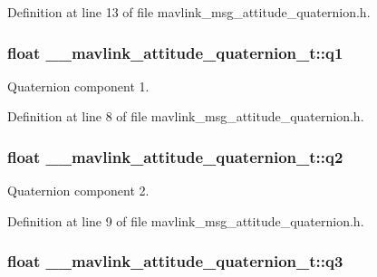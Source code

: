 Definition at line 13 of file mavlink\-\_\-msg\-\_\-attitude\-\_\-quaternion.\-h.

\hypertarget{struct____mavlink__attitude__quaternion__t_a54fd7b1cca2ab5e1b800bef5c7014b17}{
\subsubsection[{q1}]{\setlength{\rightskip}{0pt plus 5cm}float \-\_\-\-\_\-mavlink\-\_\-attitude\-\_\-quaternion\-\_\-t\-::q1}}\label{struct____mavlink__attitude__quaternion__t_a54fd7b1cca2ab5e1b800bef5c7014b17}


Quaternion component 1. 



Definition at line 8 of file mavlink\-\_\-msg\-\_\-attitude\-\_\-quaternion.\-h.

\hypertarget{struct____mavlink__attitude__quaternion__t_ad6451d99fa8f80bba96a47b3c2408255}{
\subsubsection[{q2}]{\setlength{\rightskip}{0pt plus 5cm}float \-\_\-\-\_\-mavlink\-\_\-attitude\-\_\-quaternion\-\_\-t\-::q2}}\label{struct____mavlink__attitude__quaternion__t_ad6451d99fa8f80bba96a47b3c2408255}


Quaternion component 2. 



Definition at line 9 of file mavlink\-\_\-msg\-\_\-attitude\-\_\-quaternion.\-h.

\hypertarget{struct____mavlink__attitude__quaternion__t_a6ea5423090526626cf04041c929703d5}{
\subsubsection[{q3}]{\setlength{\rightskip}{0pt plus 5cm}float \-\_\-\-\_\-mavlink\-\_\-attitude\-\_\-quaternion\-\_\-t\-::q3}}\label{struct____mavlink__attitude__quaternion__t_a6ea5423090526626cf04041c929703d5}


